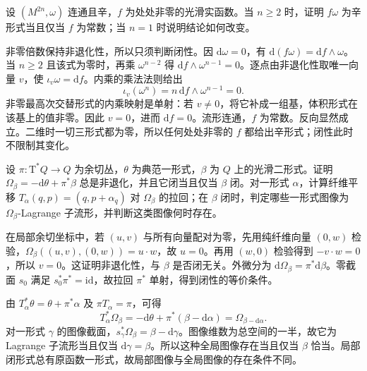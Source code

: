 \begin{exercise}\label{g4:ex:0702:conformal-factor}
	设 \((M^{2n},\omega)\) 连通且辛，\(f\) 为处处非零的光滑实函数。当 \(n\ge2\) 时，证明 \(f\omega\) 为辛形式当且仅当 \(f\) 为常数；当 \(n=1\) 时说明结论如何改变。
\end{exercise}
\begin{solution}
	非零倍数保持非退化性，所以只须判断闭性。因 \(\mathrm{d}\omega=0\)，有 \(\mathrm{d}(f\omega)=\mathrm{d}f\wedge\omega\)。当 \(n\ge2\) 且该式为零时，再乘 \(\omega^{n-2}\) 得 \(\mathrm{d}f\wedge\omega^{n-1}=0\)。逐点由非退化性取唯一向量 \(v\)，使 \(\iota_v\omega=\mathrm{d}f\)。内乘的乘法法则给出
	\[
		\iota_v(\omega^n)=n\,\mathrm{d}f\wedge\omega^{n-1}=0.
	\]
	非零最高次交替形式的内乘映射是单射：若 \(v\ne0\)，将它补成一组基，体积形式在该基上的值非零。因此 \(v=0\)，进而 \(\mathrm{d}f=0\)。流形连通，\(f\) 为常数。反向显然成立。二维时一切三形式都为零，所以任何处处非零的 \(f\) 都给出辛形式；闭性此时不限制其变化。
\end{solution}

\begin{exercise}\label{g4:ex:0702:magnetic-form}
	设 \(\pi:\mathrm{T}^*Q\to Q\) 为余切丛，\(\theta\) 为典范一形式，\(\beta\) 为 \(Q\) 上的光滑二形式。证明 \(\Omega_\beta=-\mathrm{d}\theta+\pi^*\beta\) 总是非退化，并且它闭当且仅当 \(\beta\) 闭。对一形式 \(\alpha\)，计算纤维平移 \(T_\alpha(q,p)=(q,p+\alpha_q)\) 对 \(\Omega_\beta\) 的拉回；在 \(\beta\) 闭时，判定哪些一形式图像为 \(\Omega_\beta\)-Lagrange 子流形，并判断这类图像何时存在。
\end{exercise}
\begin{solution}
	在局部余切坐标中，若 \((u,v)\) 与所有向量配对为零，先用纯纤维向量 \((0,w)\) 检验，\(\Omega_\beta((u,v),(0,w))=u\cdot w\)，故 \(u=0\)。再用 \((w,0)\) 检验得到 \(-v\cdot w=0\)，所以 \(v=0\)。这证明非退化性，与 \(\beta\) 是否闭无关。外微分为 \(\mathrm{d}\Omega_\beta=\pi^*\mathrm{d}\beta\)。零截面 \(s_0\) 满足 \(s_0^*\pi^*=\mathrm{id}\)，故拉回 \(\pi^*\) 单射，得到闭性的等价条件。

	由 \(T_\alpha^*\theta=\theta+\pi^*\alpha\) 及 \(\pi T_\alpha=\pi\)，可得
	\[
		T_\alpha^*\Omega_\beta
		=-\mathrm{d}\theta+\pi^*(\beta-\mathrm{d}\alpha)
		=\Omega_{\beta-\mathrm{d}\alpha}.
	\]
	对一形式 \(\gamma\) 的图像截面，\(s_\gamma^*\Omega_\beta=\beta-\mathrm{d}\gamma\)。图像维数为总空间的一半，故它为 Lagrange 子流形当且仅当 \(\mathrm{d}\gamma=\beta\)。所以这种全局图像存在当且仅当 \(\beta\) 恰当。局部闭形式总有原函数一形式，故局部图像与全局图像的存在条件不同。
\end{solution}

